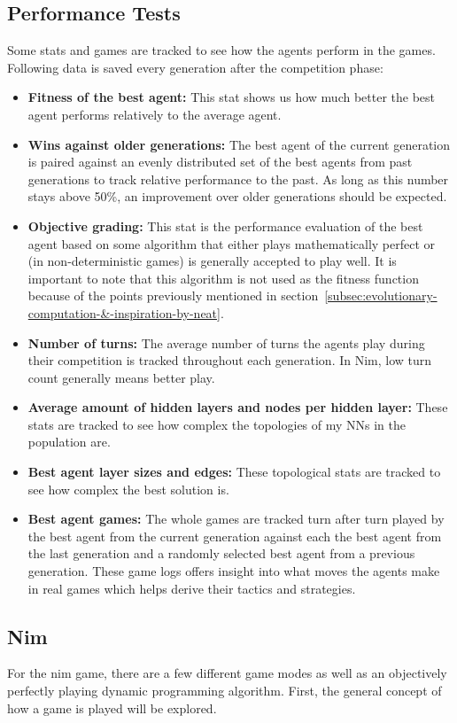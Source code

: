 \subsection{Performance Tests}\label{subsec:performance-tests}
Some stats and games are tracked to see how the agents perform in the games.
Following data is saved every generation after the competition phase:
\begin{itemize}
    \item \textbf{Fitness of the best agent:} This stat shows us how much better the best agent performs relatively to the average agent.
    \item \textbf{Wins against older generations:} The best agent of the current generation is paired against an evenly distributed set of the best agents from past generations to track relative performance to the past.
    As long as this number stays above 50\%, an improvement over older generations should be expected.
    \item \textbf{Objective grading:} This stat is the performance evaluation of the best agent based on some algorithm that either plays mathematically perfect or (in non-deterministic games) is generally accepted to play well.
    It is important to note that this algorithm is not used as the fitness function because of the points previously mentioned in section~\ref{subsec:evolutionary-computation-&-inspiration-by-neat}.
    \item \textbf{Number of turns:} The average number of turns the agents play during their competition is tracked throughout each generation.
    In Nim, low turn count generally means better play.
    \item \textbf{Average amount of hidden layers and nodes per hidden layer:} These stats are tracked to see how complex the topologies of my NNs in the population are.
    \item \textbf{Best agent layer sizes and edges:} These topological stats are tracked to see how complex the best solution is.
    \item \textbf{Best agent games:} The whole games are tracked turn after turn played by the best agent from the current generation against each the best agent from the last generation and a randomly selected best agent from a previous generation.
    These game logs offers insight into what moves the agents make in real games which helps derive their tactics and strategies.
\end{itemize}

\subsection{Nim}\label{subsec:nim-implementation}
For the nim game, there are a few different game modes as well as an objectively perfectly playing dynamic programming algorithm.
First, the general concept of how a game is played will be explored.

